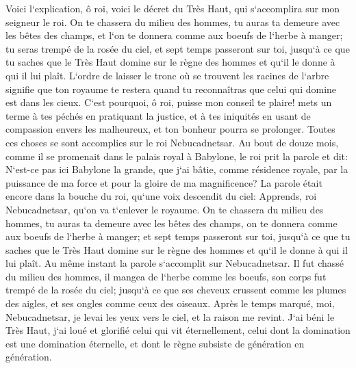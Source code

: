 \verse Voici l`explication, ô roi, voici le décret du Très Haut, qui s`accomplira sur mon seigneur le roi. 
\verse On te chassera du milieu des hommes, tu auras ta demeure avec les bêtes des champs, et l`on te donnera comme aux boeufs de l`herbe à manger; tu seras trempé de la rosée du ciel, et sept temps passeront sur toi, jusqu`à ce que tu saches que le Très Haut domine sur le règne des hommes et qu`il le donne à qui il lui plaît. 
\verse L`ordre de laisser le tronc où se trouvent les racines de l`arbre signifie que ton royaume te restera quand tu reconnaîtras que celui qui domine est dans les cieux. 
\verse C`est pourquoi, ô roi, puisse mon conseil te plaire! mets un terme à tes péchés en pratiquant la justice, et à tes iniquités en usant de compassion envers les malheureux, et ton bonheur pourra se prolonger. 
\verse Toutes ces choses se sont accomplies sur le roi Nebucadnetsar. 
\verse Au bout de douze mois, comme il se promenait dans le palais royal à Babylone, 
\verse le roi prit la parole et dit: N`est-ce pas ici Babylone la grande, que j`ai bâtie, comme résidence royale, par la puissance de ma force et pour la gloire de ma magnificence? 
\verse La parole était encore dans la bouche du roi, qu`une voix descendit du ciel: Apprends, roi Nebucadnetsar, qu`on va t`enlever le royaume. 
\verse On te chassera du milieu des hommes, tu auras ta demeure avec les bêtes des champs, on te donnera comme aux boeufs de l`herbe à manger; et sept temps passeront sur toi, jusqu`à ce que tu saches que le Très Haut domine sur le règne des hommes et qu`il le donne à qui il lui plaît. 
\verse Au même instant la parole s`accomplit sur Nebucadnetsar. Il fut chassé du milieu des hommes, il mangea de l`herbe comme les boeufs, son corps fut trempé de la rosée du ciel; jusqu`à ce que ses cheveux crussent comme les plumes des aigles, et ses ongles comme ceux des oiseaux. 
\verse Après le temps marqué, moi, Nebucadnetsar, je levai les yeux vers le ciel, et la raison me revint. J`ai béni le Très Haut, j`ai loué et glorifié celui qui vit éternellement, celui dont la domination est une domination éternelle, et dont le règne subsiste de génération en génération. 
